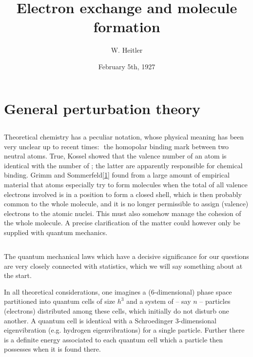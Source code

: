 
\begin{paper}{1}
\newcommand{\bond}{\,\textemdash\,}

\newcommand{\E}{\mathsf{E}}
\begin{header}
\title{Electron exchange and molecule formation}
\author{W. Heitler}
\date{February 5th, 1927}
\makeheader
\end{header}

\section{General perturbation theory}
\subsection{}
Theoretical chemistry has a peculiar notation, whose physical meaning has been very unclear up to recent times: \bond the homopolar binding mark between two neutral atoms. True, Kossel showed that the valence number of an atom is identical with the number of ; the latter are apparently responsible for chemical binding. Grimm and Sommerfeld\ref{1} found from a large amount of empirical material that atoms especially try to form molecules when the total of all valence electrons involved is in a position to form a closed shell, which is then probably common to the whole molecule, and it is no longer permissible to assign (valence) electrons to the atomic nuclei. This must also somehow manage the cohesion of the whole molecule. A precise clarification of the matter could however only be supplied with quantum mechanics.

\subsection{}
The quantum mechanical laws which have a decisive significance for our questions are very closely connected with statistics, which we will say something about at the start.

In all theoretical considerations, one imagines a (6-dimensional) phase space partitioned into quantum cells of size $h^3$ and a system of -- say $n$ -- particles (electrons) distributed among these cells, which initially do not disturb one another. A quantum cell is identical with a Schroedinger 3-dimensional eigenvibration (e.g. hydrogen eigenvibrations) for a single particle. Further there is a definite energy associated to each quantum cell which a particle then possesses when it is found there.


\end{paper}
